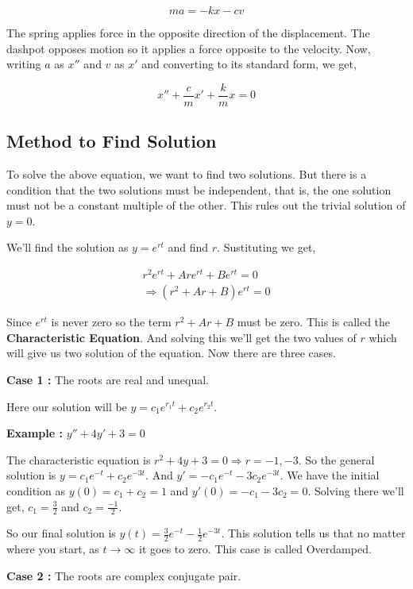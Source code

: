 $$ ma = -kx - cv $$

The spring applies force in the opposite direction of the displacement.
The dashpot opposes motion so it applies a force opposite to the velocity.
Now, writing $a$ as $x''$ and $v$ as $x'$ and converting to its standard form, we get,

$$ x'' + \frac{c}{m}x' + \frac{k}{m}x = 0 $$


\subsection{Method to Find Solution}

To solve the above equation, we want to find two solutions.
But there is a condition that the two solutions must be independent, 
that is, the one solution must not be a constant multiple of the other.
This rules out the trivial solution of $y = 0$. 

We'll find the solution as $y = e^{rt}$ and find $r$. 
Sustituting we get,

\begin{gather*}
	r^2 e^{rt} + Ar e^{rt} + B e^{rt} = 0 \\
	\Rightarrow (r^2 + Ar + B) e^{rt} = 0
\end{gather*}

Since $e^{rt}$ is never zero so the term $r^2 + Ar + B$ must be zero. 
This is called the {\bf Characteristic Equation}.
And solving this we'll get the two values of $r$ which will give us two solution of the equation.
Now there are three cases.

{\bf Case 1 : } The roots are real and unequal.
 
Here our solution will be $y = c_1 e^{r_1 t} + c_2 e^{r_2 t}$.

{\bf Example : } $y'' + 4y' + 3 = 0$

The characteristic equation is $r^2 + 4y + 3 = 0 \Rightarrow r = -1, -3$.
So the general solution is $y = c_1 e^{-t} + c_2 e^{-3t}$.
And $y' = -c_1 e^{-t} - 3c_2 e^{-3t}$.
We have the initial condition as $y(0) = c_1 + c_2 = 1$ and $y'(0) = -c_1 - 3c_2 = 0$.
Solving there we'll get, $c_1 = \frac{3}{2}$ and $c_2 = \frac{-1}{2}$. 

So our final solution is $y(t) = \frac{3}{2}e^{-t} - \frac{1}{2} e^{-3t}$.
This solution tells us that no matter where you start, as $t \to \infty$ it goes to zero.
This case is called Overdamped.

{\bf Case 2 : } The roots are complex conjugate pair.

